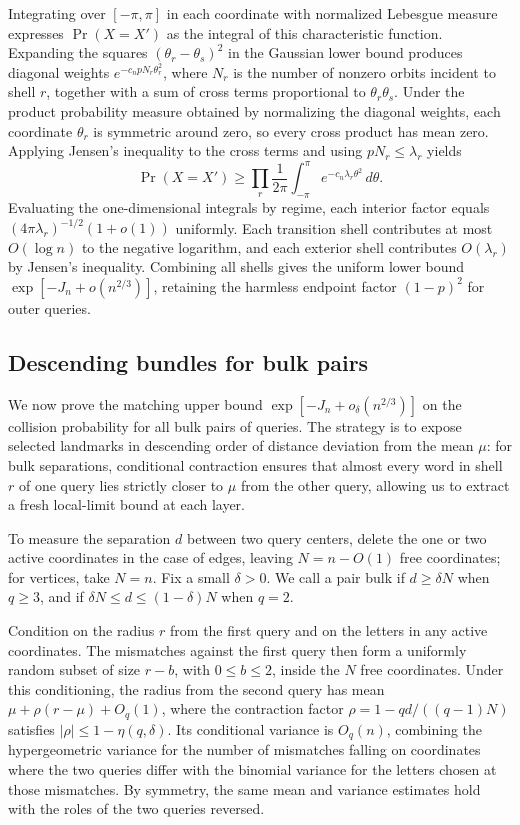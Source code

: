 Integrating over $[-\pi,\pi]$ in each coordinate with normalized Lebesgue measure expresses $\Pr(X=X')$ as the integral of this characteristic function. Expanding the squares $(\theta_r-\theta_s)^2$ in the Gaussian lower bound produces diagonal weights $e^{-c_npN_r\theta_r^2}$, where $N_r$ is the number of nonzero orbits incident to shell $r$, together with a sum of cross terms proportional to $\theta_r\theta_s$. Under the product probability measure obtained by normalizing the diagonal weights, each coordinate $\theta_r$ is symmetric around zero, so every cross product has mean zero. Applying Jensen's inequality to the cross terms and using $pN_r\le\lambda_r$ yields
\[
 \Pr(X=X')\ge \prod_r\frac1{2\pi}\int_{-\pi}^{\pi}
 e^{-c_n\lambda_r\theta^2}\,d\theta .
\]
Evaluating the one-dimensional integrals by regime, each interior factor equals $(4\pi\lambda_r)^{-1/2}(1+o(1))$ uniformly. Each transition shell contributes at most $O(\log n)$ to the negative logarithm, and each exterior shell contributes $O(\lambda_r)$ by Jensen's inequality. Combining all shells gives the uniform lower bound $\exp[-J_n+o(n^{2/3})]$, retaining the harmless endpoint factor $(1-p)^2$ for outer queries.

\subsection{Descending bundles for bulk pairs}
We now prove the matching upper bound $\exp[-J_n+o_\delta(n^{2/3})]$ on the collision probability for all bulk pairs of queries. The strategy is to expose selected landmarks in descending order of distance deviation from the mean $\mu$: for bulk separations, conditional contraction ensures that almost every word in shell $r$ of one query lies strictly closer to $\mu$ from the other query, allowing us to extract a fresh local-limit bound at each layer.

To measure the separation $d$ between two query centers, delete the one or two active coordinates in the case of edges, leaving $N=n-O(1)$ free coordinates; for vertices, take $N=n$. Fix a small $\delta>0$. We call a pair bulk if $d\ge\delta N$ when $q\ge3$, and if $\delta N\le d\le(1-\delta)N$ when $q=2$.

Condition on the radius $r$ from the first query and on the letters in any active coordinates. The mismatches against the first query then form a uniformly random subset of size $r-b$, with $0\le b\le2$, inside the $N$ free coordinates. Under this conditioning, the radius from the second query has mean $\mu+\rho(r-\mu)+O_q(1)$, where the contraction factor $\rho=1-qd/((q-1)N)$ satisfies $|\rho|\le1-\eta(q,\delta)$. Its conditional variance is $O_q(n)$, combining the hypergeometric variance for the number of mismatches falling on coordinates where the two queries differ with the binomial variance for the letters chosen at those mismatches. By symmetry, the same mean and variance estimates hold with the roles of the two queries reversed.

